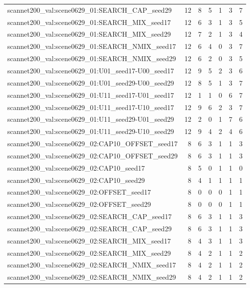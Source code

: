 \begin{table}[t]
\begin{tabular}{lrrrrrr}
scannet200\_val:scene0629\_01:SEARCH\_CAP\_seed29 & 12 & 8 & 5 & 1 & 3 & 7 \\
scannet200\_val:scene0629\_01:SEARCH\_MIX\_seed17 & 12 & 6 & 3 & 1 & 3 & 5 \\
scannet200\_val:scene0629\_01:SEARCH\_MIX\_seed29 & 12 & 7 & 2 & 1 & 3 & 4 \\
scannet200\_val:scene0629\_01:SEARCH\_NMIX\_seed17 & 12 & 6 & 4 & 0 & 3 & 7 \\
scannet200\_val:scene0629\_01:SEARCH\_NMIX\_seed29 & 12 & 6 & 2 & 0 & 3 & 5 \\
scannet200\_val:scene0629\_01:U01\_seed17-U00\_seed17 & 12 & 9 & 5 & 2 & 3 & 6 \\
scannet200\_val:scene0629\_01:U01\_seed29-U00\_seed29 & 12 & 8 & 5 & 1 & 3 & 7 \\
scannet200\_val:scene0629\_01:U11\_seed17-U01\_seed17 & 12 & 1 & 1 & 0 & 6 & 7 \\
scannet200\_val:scene0629\_01:U11\_seed17-U10\_seed17 & 12 & 9 & 6 & 2 & 3 & 7 \\
scannet200\_val:scene0629\_01:U11\_seed29-U01\_seed29 & 12 & 2 & 0 & 1 & 7 & 6 \\
scannet200\_val:scene0629\_01:U11\_seed29-U10\_seed29 & 12 & 9 & 4 & 2 & 4 & 6 \\
scannet200\_val:scene0629\_02:CAP10\_OFFSET\_seed17 & 8 & 6 & 3 & 1 & 1 & 3 \\
scannet200\_val:scene0629\_02:CAP10\_OFFSET\_seed29 & 8 & 6 & 3 & 1 & 1 & 3 \\
scannet200\_val:scene0629\_02:CAP10\_seed17 & 8 & 5 & 0 & 1 & 1 & 0 \\
scannet200\_val:scene0629\_02:CAP10\_seed29 & 8 & 4 & 1 & 1 & 1 & 1 \\
scannet200\_val:scene0629\_02:OFFSET\_seed17 & 8 & 0 & 0 & 0 & 1 & 1 \\
scannet200\_val:scene0629\_02:OFFSET\_seed29 & 8 & 0 & 0 & 0 & 1 & 1 \\
scannet200\_val:scene0629\_02:SEARCH\_CAP\_seed17 & 8 & 6 & 3 & 1 & 1 & 3 \\
scannet200\_val:scene0629\_02:SEARCH\_CAP\_seed29 & 8 & 6 & 3 & 1 & 1 & 3 \\
scannet200\_val:scene0629\_02:SEARCH\_MIX\_seed17 & 8 & 4 & 3 & 1 & 1 & 3 \\
scannet200\_val:scene0629\_02:SEARCH\_MIX\_seed29 & 8 & 4 & 2 & 1 & 1 & 2 \\
scannet200\_val:scene0629\_02:SEARCH\_NMIX\_seed17 & 8 & 4 & 2 & 1 & 1 & 2 \\
scannet200\_val:scene0629\_02:SEARCH\_NMIX\_seed29 & 8 & 4 & 2 & 1 & 1 & 2 \\

\end{tabular}
\end{table}
